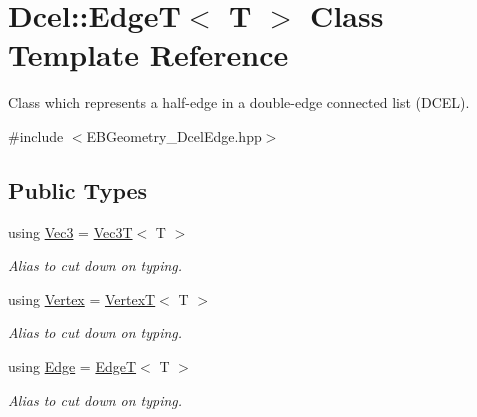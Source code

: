 \hypertarget{classDcel_1_1EdgeT}{}\section{Dcel\+:\+:EdgeT$<$ T $>$ Class Template Reference}
\label{classDcel_1_1EdgeT}


Class which represents a half-\/edge in a double-\/edge connected list (D\+C\+EL).  




{\ttfamily \#include $<$E\+B\+Geometry\+\_\+\+Dcel\+Edge.\+hpp$>$}

\subsection*{Public Types}
\begin{DoxyCompactItemize}
\item 
\mbox{\label{classDcel_1_1EdgeT_a93b8679cea557c419af44385ca6d356a}} 
using \hyperlink{classDcel_1_1EdgeT_a93b8679cea557c419af44385ca6d356a}{Vec3} = \hyperlink{classVec3T}{Vec3T}$<$ T $>$
\begin{DoxyCompactList}\small\item\em Alias to cut down on typing. \end{DoxyCompactList}\item 
\mbox{\label{classDcel_1_1EdgeT_a2409bc47d421bbea1c091fb6b15da271}} 
using \hyperlink{classDcel_1_1EdgeT_a2409bc47d421bbea1c091fb6b15da271}{Vertex} = \hyperlink{classDcel_1_1VertexT}{VertexT}$<$ T $>$
\begin{DoxyCompactList}\small\item\em Alias to cut down on typing. \end{DoxyCompactList}\item 
\mbox{\label{classDcel_1_1EdgeT_a00184663a9d069d2c7a7e0a970f71fd5}} 
using \hyperlink{classDcel_1_1EdgeT_a00184663a9d069d2c7a7e0a970f71fd5}{Edge} = \hyperlink{classDcel_1_1EdgeT}{EdgeT}$<$ T $>$
\begin{DoxyCompactList}\small\item\em Alias to cut down on typing. \end{DoxyCompactList}\item 
\mbox{\label{classDcel_1_1EdgeT_a46456b8f418abc6f09154e8e0d398e37}} 

\end{DoxyCompactItemize}
